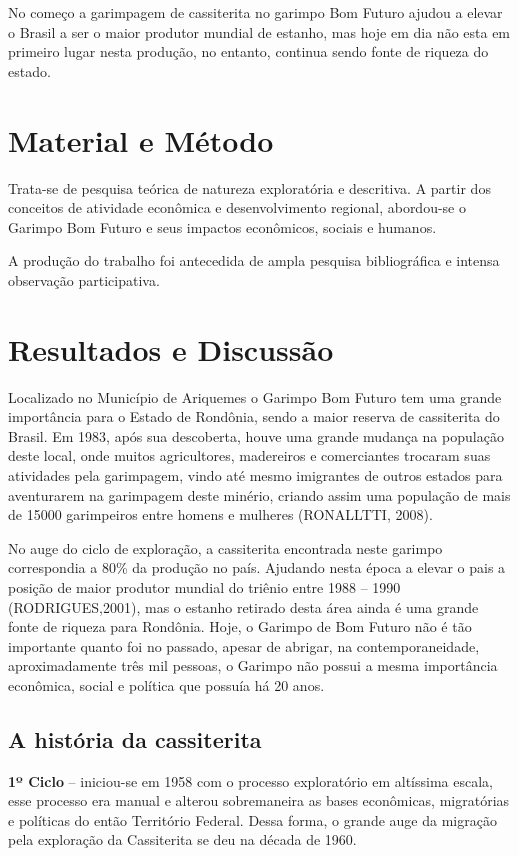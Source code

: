 \documentclass[article,12pt,onesidea,4paper,english,brazil]{abntex2}
\begin{document}
No começo a garimpagem de cassiterita no garimpo Bom Futuro ajudou a elevar o Brasil a ser o maior produtor mundial de estanho, mas hoje em dia não esta em primeiro lugar nesta produção, no entanto, continua sendo fonte de riqueza do estado.
	
	\section*{Material e Método}
	
Trata-se de pesquisa teórica de natureza exploratória e descritiva. A partir dos conceitos de atividade econômica e desenvolvimento regional, abordou-se o Garimpo Bom Futuro e seus impactos econômicos, sociais e humanos.

A produção do trabalho foi antecedida de ampla pesquisa bibliográfica e intensa observação participativa.
	
	\section*{Resultados e Discussão}
	
Localizado no Município de Ariquemes o Garimpo Bom Futuro tem uma grande importância para o Estado de Rondônia, sendo a maior reserva de cassiterita do Brasil. Em 1983, após sua descoberta, houve uma grande mudança na população deste local, onde muitos agricultores, madereiros e comerciantes trocaram suas atividades pela garimpagem, vindo até mesmo imigrantes de outros estados para aventurarem na garimpagem deste minério, criando assim uma população de mais de 15000 garimpeiros entre homens e mulheres (RONALLTTI, 2008).

No auge do ciclo de exploração, a cassiterita encontrada neste garimpo correspondia a 80\% da produção no país. Ajudando nesta época a elevar o pais a posição de maior produtor mundial do triênio entre 1988 – 1990 (RODRIGUES,2001), mas o estanho retirado desta área ainda é uma grande fonte de riqueza para Rondônia. Hoje, o Garimpo de Bom Futuro não é tão importante quanto foi no passado, apesar de abrigar, na contemporaneidade, aproximadamente três mil pessoas, o Garimpo não possui a mesma importância econômica, social e política que possuía há 20 anos.

\subsection*{A história da cassiterita}

\textbf{1º Ciclo} – iniciou-se em 1958 com o processo exploratório em altíssima escala, esse processo era manual e alterou sobremaneira as bases econômicas, migratórias e políticas do então Território Federal. Dessa forma, o grande auge da migração pela exploração da Cassiterita se deu na década de 1960.
\end{document}
